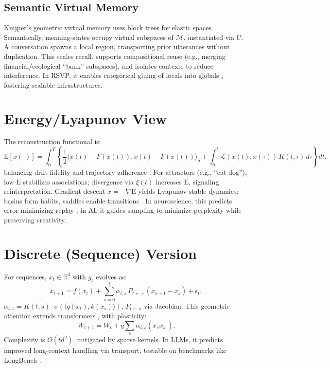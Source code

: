 \documentclass[a4paper,12pt]{article}
\newcommand{\M}{\mathcal{M}}
\newcommand{\E}{\mathrm{E}}
\begin{document}
\subsection{Semantic Virtual Memory}
Kuijper’s geometric virtual memory \citep{kuijper2021geometric} uses block trees for elastic spaces. Semantically, meaning-states occupy virtual subspaces of $\M$, instantiated via $U$. A conversation spawns a local region, transporting prior utterances without duplication. This scales recall, supports compositional reuse (e.g., merging financial/ecological ``bank'' subspaces), and isolates contexts to reduce interference. In RSVP, it enables categorical gluing of locals into globals \citep{semantic2025}, fostering scalable infrastructures.

\section{Energy/Lyapunov View}
The reconstruction functional is:
\[
\E[x(\cdot)] = \int_0^T \left\{ \frac{1}{2} \langle \dot{x}(t) - F(x(t)), \dot{x}(t) - F(x(t)) \rangle_g + \int_0^t \mathcal{L}(x(t), x(\tau)) \, K(t,\tau) \, d\tau \right\} dt,
\]
balancing drift fidelity and trajectory adherence \citep{friston2010free}. For attractors (e.g., ``cat-dog''), low $\E$ stabilizes associations; divergence via $\xi(t)$ increases $\E$, signaling reinterpretation. Gradient descent $\dot{x} = -\nabla \E$ yields Lyapunov-stable dynamics: basins form habits, saddles enable transitions \citep{hopfield1982neural}. In neuroscience, this predicts error-minimizing replay \citep{oliver2017hippocampal}; in AI, it guides sampling to minimize perplexity while preserving creativity.

\section{Discrete (Sequence) Version}
For sequences, $x_t \in \mathbb{R}^d$ with $g_t$ evolves as:
\[
x_{t+1} = f(x_t) + \sum_{s=0}^t \alpha_{t,s} \, P_{t \leftarrow s} \, (x_{s+1} - x_s) + \epsilon_t,
\]
$\alpha_{t,s} = K(t,s) \cdot \sigma(\langle q(x_t), k(x_s) \rangle)$, $P_{t \leftarrow s}$ via Jacobian. This geometric attention extends transformers \citep{vaswani2017attention}, with plasticity:
\[
W_{t+1} = W_t + \eta \sum_s \alpha_{t,s} (x_s x_s^\top).
\]
Complexity is $O(t d^2)$, mitigated by sparse kernels. In LLMs, it predicts improved long-context handling via transport, testable on benchmarks like LongBench \citep{bai2023longbench}.
\end{document}

